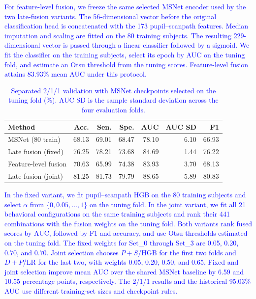 \documentclass[conference,a4paper]{IEEEtran}
\begin{document}
\textcolor{blue}{For feature-level fusion, we freeze the same selected MSNet encoder used by the two late-fusion variants. The 56-dimensional vector before the original classification head is concatenated with the 173 pupil--scanpath features. Median imputation and scaling are fitted on the 80 training subjects. The resulting 229-dimensional vector is passed through a linear classifier followed by a sigmoid. We fit the classifier on the training subjects, select its epoch by AUC on the tuning fold, and estimate an Otsu threshold from the tuning scores. Feature-level fusion attains 83.93\% mean AUC under this protocol.}

\begin{table}[t]
\color{blue}
\caption{\textcolor{blue}{Separated 2/1/1 validation with MSNet checkpoints selected on the tuning fold (\%). AUC SD is the sample standard deviation across the four evaluation folds.}}
\label{tab:separated_validation}
\centering
\footnotesize
\setlength{\tabcolsep}{2.8pt}
\begin{tabular}{lrrrrrr}
\toprule
Method & Acc. & Sen. & Spe. & AUC & AUC SD & F1 \\
\midrule
MSNet (80 train) & 68.13 & 69.01 & 68.47 & 78.10 & 6.10 & 66.93 \\
Late fusion (fixed) & 76.25 & 78.21 & 73.68 & 84.69 & 1.44 & 76.22 \\
Feature-level fusion & 70.63 & 65.99 & 74.38 & 83.93 & 3.70 & 68.13 \\
Late fusion (joint) & 81.25 & 81.73 & 79.79 & 88.65 & 5.89 & 80.83 \\
\bottomrule
\end{tabular}
\end{table}

\textcolor{blue}{In the fixed variant, we fit pupil--scanpath HGB on the 80 training subjects and select $\alpha$ from $\{0,0.05,\ldots,1\}$ on the tuning fold. In the joint variant, we fit all 21 behavioral configurations on the same training subjects and rank their 441 combinations with the fusion weights on the tuning fold. Both variants rank fused scores by AUC, followed by F1 and accuracy, and use Otsu thresholds estimated on the tuning fold. The fixed weights for Set\_0 through Set\_3 are 0.05, 0.20, 0.70, and 0.70. Joint selection chooses $P+S$/HGB for the first two folds and $D+P$/LR for the last two, with weights 0.05, 0.20, 0.50, and 0.65. Fixed and joint selection improve mean AUC over the shared MSNet baseline by 6.59 and 10.55 percentage points, respectively. The 2/1/1 results and the historical 95.03\% AUC use different training-set sizes and checkpoint rules.}
\end{document}
